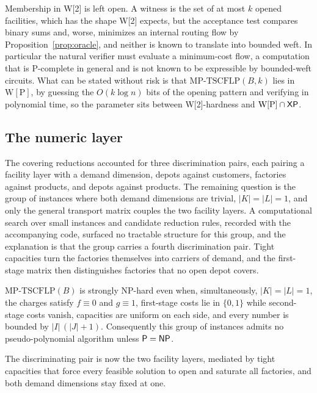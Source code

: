 \begin{remark}\label{rem:w2mem}
Membership in W[2] is left open. A witness is the set of at most $k$
opened facilities, which has the shape W[2] expects, but the acceptance
test compares binary sums and, worse, minimizes an internal routing flow
by Proposition~\ref{prop:oracle}, and neither is known to translate into
bounded weft. In particular the natural verifier must evaluate a
minimum-cost flow, a computation that is P-complete in general and is
not known to be expressible by bounded-weft circuits. What can be stated without risk is that
$\mathrm{MP\text{-}TSCFLP}(B,k)$ lies in $\mathrm{W[P]}$, by guessing the
$O(k\log n)$ bits of the opening pattern and verifying in polynomial time,
so the parameter sits between W[2]-hardness and $\mathrm{W[P]}\cap\textsf{XP}$.
\end{remark}

\subsection{The numeric layer}\label{sec:numeric}

The covering reductions accounted for three discrimination pairs, each
pairing a facility layer with a demand dimension, depots against
customers, factories against products, and depots against products. The
remaining question is the group of instances where both demand dimensions
are trivial, $|K|=|L|=1$, and only the general transport matrix couples
the two facility layers. A computational search over small instances and candidate reduction rules,
recorded with the accompanying code, surfaced no tractable structure for this
group, and the explanation is that the group carries a fourth
discrimination pair. Tight capacities turn the factories
themselves into carriers of demand, and the first-stage matrix then
distinguishes factories that no open depot covers.

\begin{theorem}\label{thm:numeric}
$\mathrm{MP\text{-}TSCFLP}(B)$ is strongly NP-hard even when,
simultaneously, $|K|=|L|=1$, the charges satisfy $f\equiv 0$ and
$g\equiv 1$, first-stage costs lie in $\{0,1\}$ while second-stage costs
vanish, capacities are uniform on each side, and every number is bounded
by $|I|\,(|J|+1)$. Consequently this
group of instances admits no pseudo-polynomial algorithm unless
$\textsf{P}=\textsf{NP}$.
\end{theorem}

The discriminating pair is now the two facility layers, mediated by
tight capacities that force every feasible solution to open and
saturate all factories, and both demand dimensions stay fixed at one.

